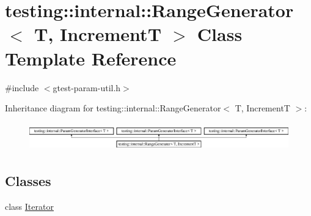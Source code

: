 \hypertarget{classtesting_1_1internal_1_1_range_generator}{}\section{testing\+::internal\+::Range\+Generator$<$ T, IncrementT $>$ Class Template Reference}
\label{classtesting_1_1internal_1_1_range_generator}


{\ttfamily \#include $<$gtest-\/param-\/util.\+h$>$}

Inheritance diagram for testing\+::internal\+::Range\+Generator$<$ T, IncrementT $>$\+:\begin{figure}[H]
\begin{center}
\leavevmode
\includegraphics[height=1.224044cm]{d9/d46/classtesting_1_1internal_1_1_range_generator}
\end{center}
\end{figure}
\subsection*{Classes}
\begin{DoxyCompactItemize}
\item 
class \mbox{\hyperlink{classtesting_1_1internal_1_1_range_generator_1_1_iterator}{Iterator}}
\end{DoxyCompactItemize}

